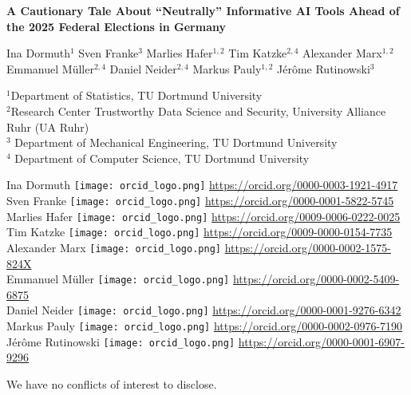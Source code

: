 \documentclass[
	fontsize=10pt,          %
	numbers=noenddot,    	%
    parskip=half,        	%
    listof=totoc,        	%
    bibliography=totoc,  	%
	headsepline=true,       %
	footsepline=false, 		%
    DIV=12                	%
]{scrartcl}
\begin{document}
\thispagestyle{empty}

\vspace{15em}

\begin{center}
\Large{\textbf{
A Cautionary Tale About “Neutrally” Informative AI Tools Ahead of the 2025 Federal Elections in Germany}}    
\end{center}

\vspace{4em}

\begin{center} %
  
    Ina Dormuth$^{1}$
    Sven Franke$^{3}$
    Marlies Hafer$^{1,2}$
    Tim Katzke$^{2,4}$
    Alexander Marx$^{1,2}$
    Emmanuel Müller$^{2,4}$
    Daniel Neider$^{2,4}$
    Markus Pauly$^{1,2}$ 
    Jérôme Rutinowski$^{3}$
    \vspace{2em}
    
    \footnotesize{
        $^{1}$Department of Statistics, TU Dortmund 
        University\\
        $^{2}$Research Center Trustworthy Data Science and Security, University Alliance Ruhr (UA Ruhr)\\
        $^{3}$ Department of Mechanical Engineering, TU Dortmund University\\
        $^{4}$ Department of Computer Science, TU Dortmund University
        }        
\end{center}


\vspace{2em}
\begin{center} %
  
     Ina Dormuth \texttt{[image: orcid\_logo.png]} \url{https://orcid.org/0000-0003-1921-4917}\\
    Sven Franke \texttt{[image: orcid\_logo.png]} \url{https://orcid.org/0000-0001-5822-5745}\\
    Marlies Hafer \texttt{[image: orcid\_logo.png]}
    \url{https://orcid.org/0009-0006-0222-0025}\\
    Tim Katzke \texttt{[image: orcid\_logo.png]} \url{https://orcid.org/0009-0000-0154-7735}\\
    Alexander Marx \texttt{[image: orcid\_logo.png]} \url{https://orcid.org/0000-0002-1575-824X}\\
    Emmanuel Müller \texttt{[image: orcid\_logo.png]} \url{https://orcid.org/0000-0002-5409-6875}\\
    Daniel Neider \texttt{[image: orcid\_logo.png]} \url{https://orcid.org/0000-0001-9276-6342}\\
    Markus Pauly \texttt{[image: orcid\_logo.png]} \url{https://orcid.org/0000-0002-0976-7190}\\
    Jérôme Rutinowski \texttt{[image: orcid\_logo.png]} \url{https://orcid.org/0000-0001-6907-9296}
\vspace{2em}

We have no conflicts of interest to disclose.    
\end{center}
\end{document}
